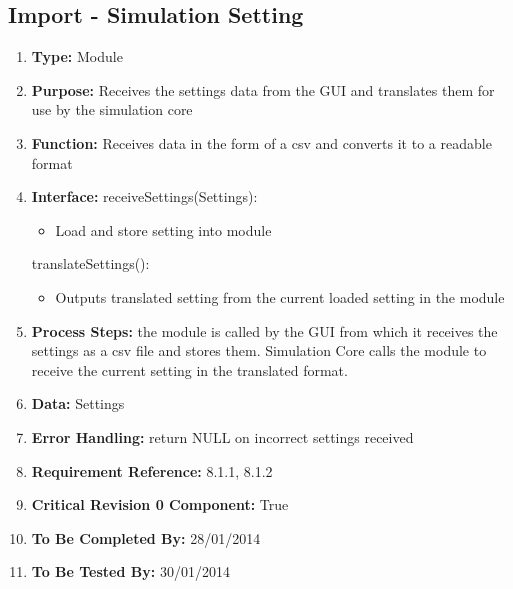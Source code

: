 \documentclass[paper=letter, fontsize=10pt]{scrartcl}
\numberwithin{equation}{section}		%
\numberwithin{figure}{section}			%
\numberwithin{table}{section}				%
\begin{document}
\subsection{Import - Simulation Setting}
\begin{enumerate}[]
	\item \textbf{Type:} Module
	\item \textbf{Purpose:} Receives the settings data from the GUI and translates them for use by the simulation core
	\item \textbf{Function:} Receives data in the form of a csv and converts it to a readable format
	\item \textbf{Interface:} \newline
	receiveSettings(Settings):
	 	\begin{itemize}
	 		\item Load and store setting into module
	 	\end{itemize}
	 translateSettings():
	 	\begin{itemize}
	 		\item Outputs translated setting from the current loaded setting in the module
	 	\end{itemize}
	\item \textbf{Process Steps:} the module is called by the GUI from which it receives the settings as a csv file and stores them. Simulation Core calls the module to receive the current setting in the translated format. 
	\item \textbf{Data:} Settings
	\item \textbf{Error Handling:} return NULL on incorrect settings received
	\item \textbf{Requirement Reference:} 8.1.1, 8.1.2
	\item \textbf{Critical Revision 0 Component:} True
	\item \textbf{To Be Completed By:} 28/01/2014
	\item \textbf{To Be Tested By:} 30/01/2014
\end{enumerate}
\end{document}
